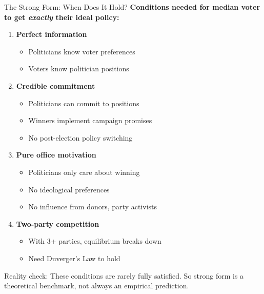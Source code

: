 \documentclass[10pt]{beamer}
\begin{document}
\begin{frame}[allowframebreaks]{The Strong Form: When Does It Hold?}
\textbf{Conditions needed for median voter to get \textit{exactly} their ideal policy:}


\begin{enumerate}
\item \textbf{Perfect information}
\begin{itemize}
\item Politicians know voter preferences
\item Voters know politician positions
\end{itemize}


\item \textbf{Credible commitment}
\begin{itemize}
\item Politicians can commit to positions
\item Winners implement campaign promises
\item No post-election policy switching
\end{itemize}

 \framebreak   
\item \textbf{Pure office motivation}
\begin{itemize}
\item Politicians only care about winning
\item No ideological preferences
\item No influence from donors, party activists
\end{itemize}


\item \textbf{Two-party competition}
\begin{itemize}
\item With 3+ parties, equilibrium breaks down
\item Need Duverger's Law to hold
\end{itemize}
\end{enumerate}



\alert{Reality check:} These conditions are rarely fully satisfied. So strong form is a theoretical benchmark, not always an empirical prediction.
\end{frame}
\end{document}
